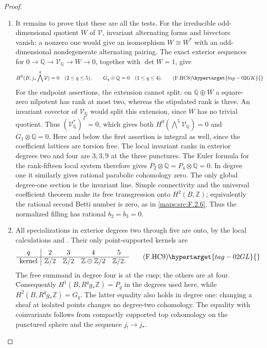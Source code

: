 \begin{proof}
\begin{enumerate}[label={$\langle1\rangle$\arabic*.}]
\item It remains to prove that these are all the tests.
For the irreducible odd-dimensional quotient $W$
of $\mathcal V$, invariant alternating forms and
bivectors vanish: a nonzero one would give an
isomorphism $W\cong W^*$ with an odd-dimensional
nondegenerate alternating pairing.
The exact exterior sequences for
$0\to\mathbb Q\to\mathcal V_{\mathbb Q}\to W\to0$,
together with $\det W=1$, give
\[
 H^0(B,j_*\bigwedge^q\mathcal V)=0
       \quad(2\le q\le5),\qquad
 G_q\otimes\mathbb Q=0\quad(1\le q\le4).
 \tag{F.HC8}\hypertarget{tag-02GK}{}\label{maps:eq:F.HC8}
\]
For the endpoint assertions, the extension cannot split:
on $\mathbb Q\oplus W$ a square-zero nilpotent has rank at
most two, whereas the stipulated rank is three.
An invariant covector of $\mathcal V_{\mathbb Q}$ would
split this extension, since $W$ has no trivial quotient.
Thus $(\mathcal V_{\mathbb Q}^*)^\Gamma=0$, which gives
both $H^0(\bigwedge^5\mathcal V_{\mathbb Q})=0$ and
$G_1\otimes\mathbb Q=0$.
Here and below the first assertion is integral as well,
since the coefficient lattices are torsion free.
The local invariant ranks in exterior degrees two
and four are $3,3,9$ at the three punctures.
The Euler formula for the rank-fifteen local system
therefore gives $P_2\otimes\mathbb Q=P_4\otimes\mathbb Q=0$.
In degree one it similarly gives rational parabolic
cohomology zero.
The only global degree-one section is the invariant
line.  Simple connectivity and the universal
coefficient theorem make its free transgression
onto $H^2(B,\mathbb Z)$; equivalently the rational
second Betti number is zero, as in \ref{maps:src:F.2.6}.
Thus the normalized filling has rational $b_2=b_3=0$.

\item All specializations in exterior degrees two through
five are onto, by the local calculations and .
Their only point-supported kernels are
\[
\begin{array}{c|cccc}
q&2&3&4&5\\ \hline
\text{kernel}&\mathbb Z/2&\mathbb Z/2&
                 \mathbb Z\oplus\mathbb Z/2&\mathbb Z/2 .
\end{array}
\tag{F.HC9}\hypertarget{tag-02GL}{}\label{maps:eq:F.HC9}
\]
The free summand in degree four is at the cusp; the
others are at four.
Consequently $H^1(B,R^qg_*\mathbb Z)=P_q$ in the
degrees used here, while
$H^2(B,R^qg_*\mathbb Z)=G_q$.
The latter equality also holds in degree one:
changing a sheaf at isolated points changes no
degree-two cohomology.  The equality with coinvariants
follows from compactly supported top cohomology on
the punctured sphere and the sequence $j_!\to j_*$.


\end{enumerate}
\end{proof}
